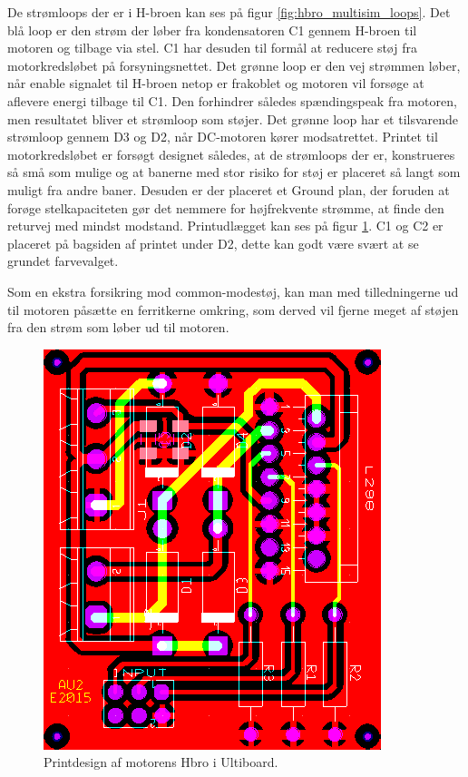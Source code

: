 De strømloops der er i H-broen kan ses på figur \ref{fig:hbro_multisim_loops}. Det blå loop er den strøm der løber fra kondensatoren C1 gennem H-broen til motoren og tilbage via stel. C1 har desuden til formål at reducere støj fra motorkredsløbet på forsyningsnettet.
Det grønne loop er den vej strømmen løber, når enable signalet til H-broen netop er frakoblet og motoren vil forsøge at aflevere energi tilbage til C1. Den forhindrer således spændingspeak fra motoren, men resultatet bliver et strømloop som støjer. Det grønne loop har et tilsvarende strømloop gennem D3 og D2, når DC-motoren kører modsatrettet.
Printet til motorkredsløbet er forsøgt designet således, at de strømloops der er, konstrueres så små som mulige og at banerne med stor risiko for støj er placeret så langt som muligt fra andre baner. Desuden er der placeret et Ground plan, der foruden at forøge stelkapaciteten gør det nemmere for højfrekvente strømme, at finde den returvej med mindst modstand. Printudlægget kan ses på figur \ref{fig:hbro_ultiboard}.
C1 og C2 er placeret på bagsiden af printet under D2, dette kan godt være svært at se grundet farvevalget.

Som en ekstra forsikring mod common-modestøj, kan man med tilledningerne ud til motoren påsætte en ferritkerne omkring, som derved vil fjerne meget af støjen fra den strøm som løber ud til motoren.

\begin{figure}[h]
\centering
\includegraphics[scale=1]{../fig/billeder/hbro_ultiboard.png}
\caption{Printdesign af motorens Hbro i Ultiboard.}
\label{fig:hbro_ultiboard}
\end{figure}

